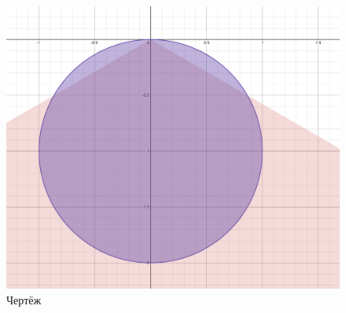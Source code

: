 \documentclass[12pt, a4paper]{article}
\begin{document}
    \begin{figure}[h!]
        \centering
        \includegraphics[width=\textwidth]{resources/2.2_figure.png}
        \caption{Чертёж}
        \label{fig:main_figure}
    \end{figure}
    \FloatBarrier
\end{document}
